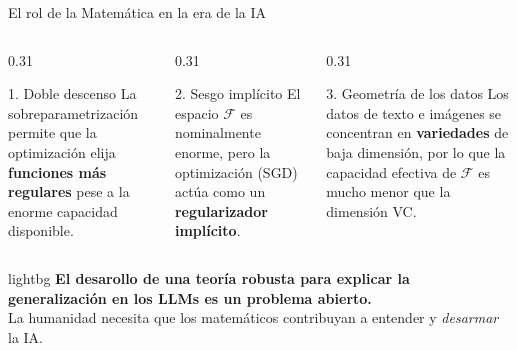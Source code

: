 \documentclass[aspectratio=169, 10pt]{beamer}
\begin{document}
\begin{frame}{El rol de la Matemática en la era de la IA}
    \begin{columns}[t]
        \begin{column}{0.31\textwidth}
            \begin{block}{1. Doble descenso}
                \small
                La sobreparametrización permite que la optimización elija 
                \textbf{funciones más regulares} pese a la enorme capacidad disponible.
            \end{block}
        \end{column}
        \pause
        \begin{column}{0.31\textwidth}
            \begin{block}{2. Sesgo implícito}
                \small
                El espacio $\mathcal{F}$ es nominalmente enorme, pero la optimización (SGD) actúa como un \textbf{regularizador implícito}.
                \vspace{0.2cm}
               \end{block}
        \end{column}
        \pause
        \begin{column}{0.31\textwidth}
            \begin{block}{3. Geometría de los datos}
                \small
               Los datos de texto e imágenes se concentran en \textbf{variedades} de baja dimensión,
               por lo que la capacidad efectiva de $\mathcal{F}$ es mucho menor que la dimensión VC.
            \end{block}
        \end{column}
    \end{columns}
    \pause
    \vspace{0.6cm}
    \begin{beamercolorbox}[wd=\textwidth, rounded=true, center, sep=8pt]{lightbg}
        \textcolor{accentblue}{\textbf{El desarollo de una teoría robusta para explicar la generalización en los LLMs es un problema abierto.}
        } \pause \\
        La humanidad necesita que los matemáticos contribuyan a entender y \textit{desarmar} la IA.
      \end{beamercolorbox}

\end{frame}
\end{document}
